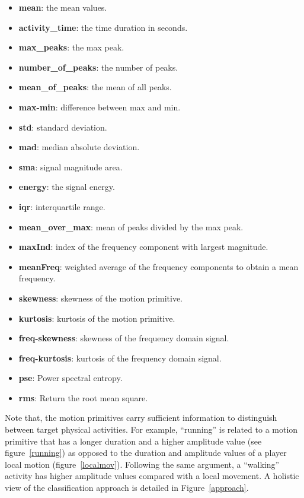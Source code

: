 \begin{itemize}
\item \textbf{mean}:  the mean values.
\item \textbf{activity\_time}: the time duration in seconds.
\item \textbf{max\_peaks}:  the max peak.
\item \textbf{number\_of\_peaks}:  the number of peaks.
\item \textbf{mean\_of\_peaks}: the mean of all peaks.
\item \textbf{max-min}: difference between max and min.
\item \textbf{std}: standard deviation.
\item \textbf{mad}: median absolute deviation.
\item \textbf{sma}: signal magnitude area.
\item \textbf{energy}: the signal energy.
\item \textbf{iqr}: interquartile range.
\item \textbf{mean\_over\_max}: mean of peaks divided by the max peak.
\item \textbf{maxInd}: index of the frequency component with largest magnitude.
\item \textbf{meanFreq}:  weighted average of the frequency components to obtain a mean frequency.
\item \textbf{skewness}:  skewness of the motion primitive.
\item \textbf{kurtosis}:  kurtosis of the motion primitive.
\item \textbf{freq-skewness}: skewness of the frequency domain signal.
\item \textbf{freq-kurtosis}: kurtosis of the frequency domain signal.
\item \textbf{pse}: Power spectral entropy.
\item \textbf{rms}: Return the root mean square.
\end{itemize}


Note that, the motion primitives carry sufficient information to distinguish between target physical activities. For example, ``running'' is related to a motion primitive that has a longer duration and a higher amplitude value (see figure~\ref{running}) as opposed to the duration and amplitude values of a player local motion (figure~\ref{localmov}). Following the same argument, a ``walking'' activity has higher amplitude values compared with a local movement. A holistic view of the classification approach is detailed in Figure~\ref{approach}. 

